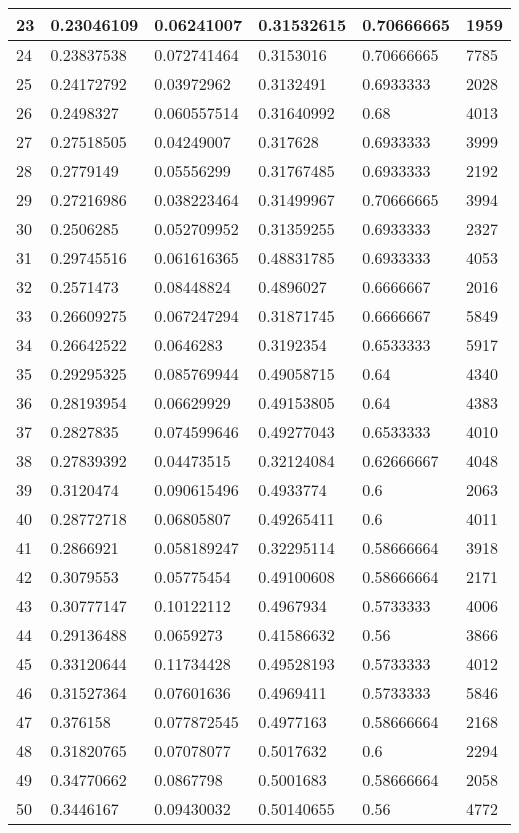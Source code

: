 \begin{longtable}{|l|l|l|l|l|l|}
23 & 0.23046109 & 0.06241007 & 0.31532615 & 0.70666665 & 1959 \\ \hline 
24 & 0.23837538 & 0.072741464 & 0.3153016 & 0.70666665 & 7785 \\ \hline 
25 & 0.24172792 & 0.03972962 & 0.3132491 & 0.6933333 & 2028 \\ \hline 
26 & 0.2498327 & 0.060557514 & 0.31640992 & 0.68 & 4013 \\ \hline 
27 & 0.27518505 & 0.04249007 & 0.317628 & 0.6933333 & 3999 \\ \hline 
28 & 0.2779149 & 0.05556299 & 0.31767485 & 0.6933333 & 2192 \\ \hline 
29 & 0.27216986 & 0.038223464 & 0.31499967 & 0.70666665 & 3994 \\ \hline 
30 & 0.2506285 & 0.052709952 & 0.31359255 & 0.6933333 & 2327 \\ \hline 
31 & 0.29745516 & 0.061616365 & 0.48831785 & 0.6933333 & 4053 \\ \hline 
32 & 0.2571473 & 0.08448824 & 0.4896027 & 0.6666667 & 2016 \\ \hline 
33 & 0.26609275 & 0.067247294 & 0.31871745 & 0.6666667 & 5849 \\ \hline 
34 & 0.26642522 & 0.0646283 & 0.3192354 & 0.6533333 & 5917 \\ \hline 
35 & 0.29295325 & 0.085769944 & 0.49058715 & 0.64 & 4340 \\ \hline 
36 & 0.28193954 & 0.06629929 & 0.49153805 & 0.64 & 4383 \\ \hline 
37 & 0.2827835 & 0.074599646 & 0.49277043 & 0.6533333 & 4010 \\ \hline 
38 & 0.27839392 & 0.04473515 & 0.32124084 & 0.62666667 & 4048 \\ \hline 
39 & 0.3120474 & 0.090615496 & 0.4933774 & 0.6 & 2063 \\ \hline 
40 & 0.28772718 & 0.06805807 & 0.49265411 & 0.6 & 4011 \\ \hline 
41 & 0.2866921 & 0.058189247 & 0.32295114 & 0.58666664 & 3918 \\ \hline 
42 & 0.3079553 & 0.05775454 & 0.49100608 & 0.58666664 & 2171 \\ \hline 
43 & 0.30777147 & 0.10122112 & 0.4967934 & 0.5733333 & 4006 \\ \hline 
44 & 0.29136488 & 0.0659273 & 0.41586632 & 0.56 & 3866 \\ \hline 
45 & 0.33120644 & 0.11734428 & 0.49528193 & 0.5733333 & 4012 \\ \hline 
46 & 0.31527364 & 0.07601636 & 0.4969411 & 0.5733333 & 5846 \\ \hline 
47 & 0.376158 & 0.077872545 & 0.4977163 & 0.58666664 & 2168 \\ \hline 
48 & 0.31820765 & 0.07078077 & 0.5017632 & 0.6 & 2294 \\ \hline 
49 & 0.34770662 & 0.0867798 & 0.5001683 & 0.58666664 & 2058 \\ \hline 
50 & 0.3446167 & 0.09430032 & 0.50140655 & 0.56 & 4772 \\ \hline 
\end{longtable}